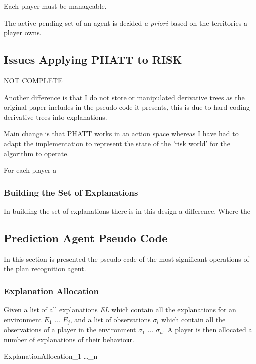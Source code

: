 \documentclass[parskip]{cs4rep}
\begin{document}
Each player must be manageable.

The active pending set of an agent is decided \textit{a priori} based on the territories a player owns.

\subsection{Issues Applying PHATT to RISK}

NOT COMPLETE

Another difference is that I do not store or manipulated derivative trees as the original paper includes in the pseudo code it presents, this is due to hard coding derivative trees into explanations.

Main change is that PHATT works in an action space whereas I have had to adapt the implementation to represent the state of the 'risk world' for the algorithm to operate.

For each player a 

\subsubsection{Building the Set of Explanations}

In building the set of explanations there is in this design a difference. Where the 

\subsection{Prediction Agent Pseudo Code}

In this section is presented the pseudo code of the most significant operations of the plan recognition agent.

\subsubsection{Explanation Allocation}

Given a list of all explanations \textit{EL} which contain all the explanations for an environment $E_1$ $\dots$ $E_j$, and a list of observations $\sigma_l$ which contain all the observations of a player in the environment $\sigma_1$ $\dots$ $\sigma_n$.  A player is then allocated a number of explanations of their behaviour.

\begin{pseudocode}{ExplanationAllocation}{\sigma_1 \dots \sigma_n}
\begin{algorithm}[H]
\end{algorithm}
\end{pseudocode}
\end{document}
